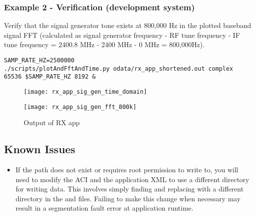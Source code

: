 \subsubsection{Example 2 - Verification (development system)}
Verify that the signal generator tone exists at 800,000 Hz in the plotted baseband signal FFT (calculated as signal generator frequency - RF tune frequency - IF tune frequency = 2400.8 MHz - 2400 MHz - 0 MHz = 800,000Hz).
\begin{lstlisting}
SAMP_RATE_HZ=2500000
./scripts/plotAndFftAndTime.py odata/rx_app_shortened.out complex 65536 $SAMP_RATE_HZ 8192 &
\end{lstlisting}
        \begin{figure}[H]
        \begin{minipage}{.5\textwidth}
                \texttt{[image: rx\_app\_sig\_gen\_time\_domain]}
                \label{fig:rx_app_sig_gen_time_domain}
        \end{minipage}%
        \begin{minipage}{.5\textwidth}
                \texttt{[image: rx\_app\_sig\_gen\_fft\_800k]}
        \end{minipage}
                \caption{Output of RX app}
                \label{fig:rx_app_sig_gen_fft}
        \end{figure}
\pagebreak
\subsection{Known Issues}
\noindent
\begin{itemize}
  \item If the path  does not exist or requires root permission to write to, you will need to modify the ACI and the application XML to use a different directory for writing data. This involves simply finding and replacing  with a different directory in the  and  files. Failing to make this change when necessary may result in a segmentation fault error at application runtime.
\end{itemize}
